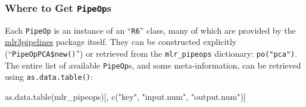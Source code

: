 \documentclass[
]{scrbook}
\newenvironment{Shaded}{\begin{snugshade}}{\end{snugshade}}
\newcommand{\FunctionTok}[1]{\textcolor[rgb]{0.00,0.00,0.00}{#1}}
\newcommand{\NormalTok}[1]{#1}
\newcommand{\StringTok}[1]{\textcolor[rgb]{0.31,0.60,0.02}{#1}}
\renewenvironment{Shaded} {\begin{snugshade}\small} {\end{snugshade}}
\begin{document}
\hypertarget{where-to-get-pipeops}{%
\subsubsection{\texorpdfstring{Where to Get \texttt{PipeOp}s}{Where to Get PipeOps}}\label{where-to-get-pipeops}}

Each \texttt{PipeOp} is an instance of an ``\texttt{R6}'' class, many of which are provided by the \href{https://cran.r-project.org/package=mlr3pipelines}{mlr3pipelines} package itself.
They can be constructed explicitly (``\texttt{PipeOpPCA\$new()}'') or retrieved from the \texttt{mlr\_pipeops} dictionary: \texttt{po("pca")}.
The entire list of available \texttt{PipeOp}s, and some meta-information, can be retrieved using \texttt{as.data.table()}:

\begin{Shaded}
\begin{Highlighting}[]
\FunctionTok{as.data.table}\NormalTok{(mlr\_pipeops)[, }\FunctionTok{c}\NormalTok{(}\StringTok{"key"}\NormalTok{, }\StringTok{"input.num"}\NormalTok{, }\StringTok{"output.num"}\NormalTok{)]}
\end{Highlighting}
\end{Shaded}
\end{document}
